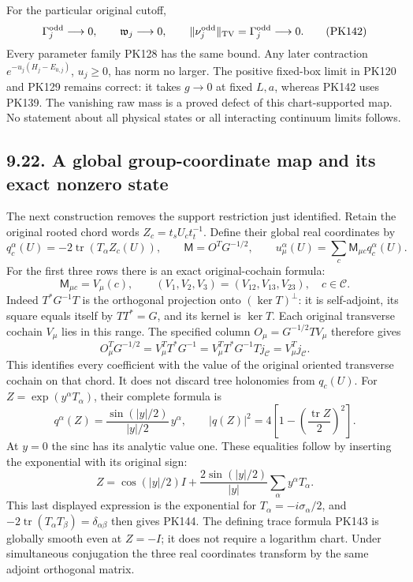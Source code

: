 \documentclass[11pt]{article}
\begin{document}
For the particular original cutoff,
\[
 \Gamma_j^{\rm odd}\longrightarrow0,\qquad
 \mathfrak w_j\longrightarrow0,\qquad
 \|\nu_j^{\rm odd}\|_{\rm TV}=\Gamma_j^{\rm odd}\longrightarrow0 .
 \tag{PK142}
\]
Every parameter family PK128 has the same bound. Any later contraction
\(e^{-u_j(H_j-E_{0,j})}\), \(u_j\ge0\), has norm no larger.
The positive fixed-box limit in PK120 and PK129 remains correct: it
takes \(g\to0\) at fixed \(L,a\), whereas PK142 uses PK139.
The vanishing raw mass is a proved defect of this chart-supported map.
No statement about all physical states or all interacting continuum
limits follows.

\subsection*{9.22. A global group-coordinate map and its exact nonzero state}

The next construction removes the support restriction just identified.
Retain the original rooted chord words \(Z_c=t_sU_ct_t^{-1}\).
Define their global real coordinates by
\[
 q_c^\alpha(U)=-2\operatorname{tr}(T_\alpha Z_c(U)),\qquad
 \mathsf M=O^TG^{-1/2},\qquad
 u_\mu^\alpha(U)=\sum_c\mathsf M_{\mu c}q_c^\alpha(U).
 \tag{PK143}
\]
For the first three rows there is an exact original-cochain formula:
\[
 \mathsf M_{\mu c}=V_\mu(c),\qquad
 (V_1,V_2,V_3)=(V_{12},V_{13},V_{23}),\quad c\in\mathcal C .
 \tag{PK143a}
\]
Indeed \(T^*G^{-1}T\) is the orthogonal projection onto
\((\ker T)^\perp\): it is self-adjoint, its square equals itself
by \(TT^*=G\), and its kernel is \(\ker T\).
Each original transverse cochain \(V_\mu\) lies in this range.
The specified column \(O_\mu=G^{-1/2}TV_\mu\) therefore gives
\[
 O_\mu^TG^{-1/2}
 =V_\mu^TT^*G^{-1}
 =V_\mu^TT^*G^{-1}Tj_{\mathcal C}
 =V_\mu^Tj_{\mathcal C}.
\]
This identifies every coefficient with the value of the original
oriented transverse cochain on that chord. It does not discard tree
holonomies from \(q_c(U)\).
For \(Z=\exp(y^\alpha T_\alpha)\), their complete formula is
\[
 q^\alpha(Z)
 =\frac{\sin(|y|/2)}{|y|/2}\,y^\alpha,\qquad
 |q(Z)|^2=4\left[1-\left(\frac{\operatorname{tr}Z}{2}\right)^2\right].
 \tag{PK144}
\]
At \(y=0\) the sinc has its analytic value one. These equalities
follow by inserting the exponential with its original sign:
\[
 Z=\cos(|y|/2)I+
             \frac{2\sin(|y|/2)}{|y|}\sum_\alpha y^\alpha T_\alpha.
\]
This last displayed expression is the exponential for
\(T_\alpha=-i\sigma_\alpha/2\), and
\(-2\operatorname{tr}(T_\alpha T_\beta)=\delta_{\alpha\beta}\)
then gives PK144. The defining trace formula PK143 is globally
smooth even at \(Z=-I\); it does not require a logarithm chart.
Under simultaneous conjugation the three real coordinates transform
by the same adjoint orthogonal matrix.
\end{document}

